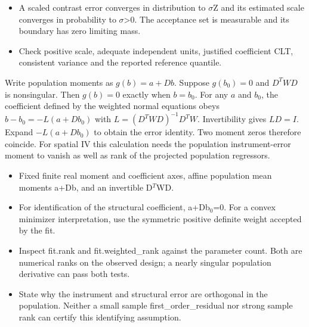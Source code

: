 \expandafter\def\csname statadic@assumptions@STATADIC-WALD-001\endcsname{\begin{itemize}
\item A scaled contrast error converges in distribution to \ensuremath{\sigma}Z and its estimated scale converges in probability to \ensuremath{\sigma}>0. The acceptance set is measurable and its boundary has zero limiting mass.
\end{itemize}}
\expandafter\def\csname statadic@diagnostics@STATADIC-WALD-001\endcsname{\begin{itemize}
\item Check positive scale, adequate independent units, justified coefficient CLT, consistent variance and the reported reference quantile.
\end{itemize}}
\expandafter\def\csname statadic@statement@STATADIC-GMM-004\endcsname{Write population moments as $g(b)=a+Db$. Suppose
  $g(b_0)=0$ and $D^T W D$ is nonsingular. Then $g(b)=0$ exactly when
  $b=b_0$. For any $a$ and $b_0$, the coefficient defined by the weighted
  normal equations obeys $\hat b-b_0=-L(a+Db_0)$ with
  $L=(D^T W D)^{-1}D^T W$.}
\expandafter\def\csname statadic@proof@STATADIC-GMM-004\endcsname{Invertibility gives $LD=I$. Expand $-L(a+Db_0)$ to
  obtain the error identity. Two moment zeros therefore coincide. For spatial
  IV this calculation needs the population instrument-error moment to vanish
  as well as rank of the projected population regressors.}
\expandafter\def\csname statadic@assumptions@STATADIC-GMM-004\endcsname{\begin{itemize}
\item Fixed finite real moment and coefficient axes, affine population mean moments a+Db, and an invertible D\ensuremath{{}^T}WD.
\item For identification of the structural coefficient, a+Db\ensuremath{{}_0}=0. For a convex minimizer interpretation, use the symmetric positive definite weight accepted by the fit.
\end{itemize}}
\expandafter\def\csname statadic@diagnostics@STATADIC-GMM-004\endcsname{\begin{itemize}
\item Inspect fit.rank and fit.weighted\_rank against the parameter count. Both are numerical ranks on the observed design; a nearly singular population derivative can pass both tests.
\item State why the instrument and structural error are orthogonal in the population. Neither a small sample first\_order\_residual nor strong sample rank can certify this identifying assumption.
\end{itemize}}
